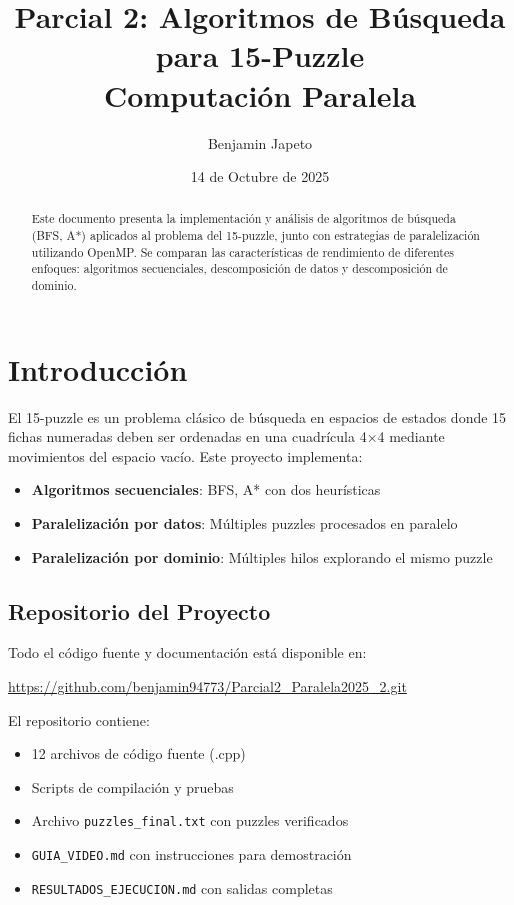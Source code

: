 \documentclass[12pt,a4paper]{article}
\title{\textbf{Parcial 2: Algoritmos de Búsqueda para 15-Puzzle}\\
\large Computación Paralela}
\author{Benjamin Japeto}
\date{14 de Octubre de 2025}
\begin{document}
\maketitle

\begin{abstract}
Este documento presenta la implementación y análisis de algoritmos de búsqueda (BFS, A*) aplicados al problema del 15-puzzle, junto con estrategias de paralelización utilizando OpenMP. Se comparan las características de rendimiento de diferentes enfoques: algoritmos secuenciales, descomposición de datos y descomposición de dominio.
\end{abstract}

\tableofcontents
\newpage

\section{Introducción}

El 15-puzzle es un problema clásico de búsqueda en espacios de estados donde 15 fichas numeradas deben ser ordenadas en una cuadrícula 4×4 mediante movimientos del espacio vacío. Este proyecto implementa:

\begin{itemize}
    \item \textbf{Algoritmos secuenciales}: BFS, A* con dos heurísticas
    \item \textbf{Paralelización por datos}: Múltiples puzzles procesados en paralelo
    \item \textbf{Paralelización por dominio}: Múltiples hilos explorando el mismo puzzle
\end{itemize}

\subsection{Repositorio del Proyecto}

Todo el código fuente y documentación está disponible en:

\begin{center}
\url{https://github.com/benjamin94773/Parcial2_Paralela2025_2.git}
\end{center}

El repositorio contiene:
\begin{itemize}
    \item 12 archivos de código fuente (.cpp)
    \item Scripts de compilación y pruebas
    \item Archivo \texttt{puzzles\_final.txt} con puzzles verificados
    \item \texttt{GUIA\_VIDEO.md} con instrucciones para demostración
    \item \texttt{RESULTADOS\_EJECUCION.md} con salidas completas
\end{itemize}
\end{document}
